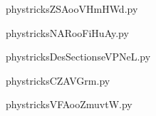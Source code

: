     

    \clearpage
    


    \newcommand{\CaptionFigZSAooVHmHWd}{<+Type your caption here+>}
    \begin{center}
        
    \end{center}
    phystricksZSAooVHmHWd.py

    

    \clearpage
    


    \newcommand{\CaptionFigNARooFiHuAy}{<+Type your caption here+>}
    \begin{center}
        
    \end{center}
    phystricksNARooFiHuAy.py

    

    \clearpage
    


    \newcommand{\CaptionFigDesSectionseVPNeL}{<+Type your caption here+>}
    \begin{center}
        
    \end{center}
    phystricksDesSectionseVPNeL.py

    

    \clearpage
    


    \newcommand{\CaptionFigCZAVGrm}{<+Type your caption here+>}
    \begin{center}
        
    \end{center}
    phystricksCZAVGrm.py

    

    \clearpage
    


    \newcommand{\CaptionFigVFAooZmuvtW}{<+Type your caption here+>}
    \begin{center}
        
    \end{center}
    phystricksVFAooZmuvtW.py

    

    \clearpage
    


